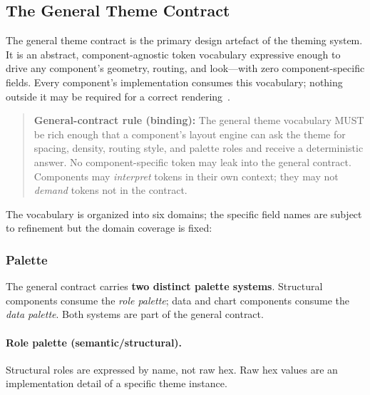 
\subsection{The General Theme Contract}
\label{sec:themes-contract}

The general theme contract is the primary design artefact of the theming system. It is an
abstract, component-agnostic token vocabulary expressive enough to drive any component's
geometry, routing, and look---with zero component-specific fields. Every component's
implementation consumes this vocabulary; nothing outside it may be required for a correct
rendering~\cite{dtcg2024}.

\begin{quote}
\textbf{General-contract rule (binding):} The general theme vocabulary MUST be rich enough
that a component's layout engine can ask the theme for spacing, density, routing style, and
palette roles and receive a deterministic answer. No component-specific token may leak into
the general contract. Components may \emph{interpret} tokens in their own context; they may
not \emph{demand} tokens not in the contract.
\end{quote}

The vocabulary is organized into six domains; the specific field names are subject to
refinement but the domain coverage is fixed:

\subsubsection{Palette}
\label{sec:contract-palette}

The general contract carries \textbf{two distinct palette systems}. Structural
components consume the \emph{role palette}; data and chart components consume the
\emph{data palette}. Both systems are part of the general contract.

\paragraph{Role palette (semantic/structural).}
Structural roles are expressed by name, not raw hex. Raw hex values are an
implementation detail of a specific theme instance.

